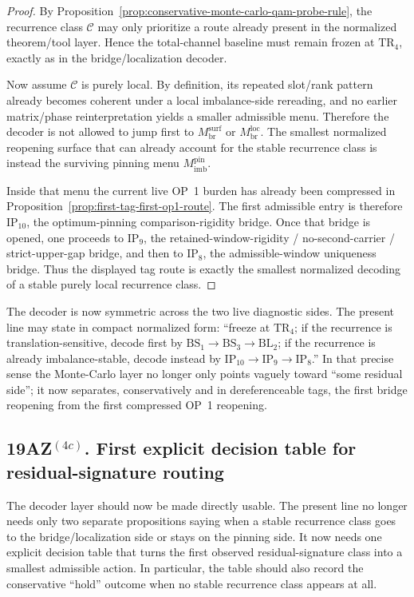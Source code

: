 \begin{proof}
By Proposition~\ref{prop:conservative-monte-carlo-qam-probe-rule}, the recurrence class \(\mathcal C\) may only prioritize a route already present in the normalized theorem/tool layer. Hence the total-channel baseline must remain frozen at \(\mathrm{TR}_4\), exactly as in the bridge/localization decoder.

Now assume \(\mathcal C\) is purely local. By definition, its repeated slot/rank pattern already becomes coherent under a local imbalance-side rereading, and no earlier matrix/phase reinterpretation yields a smaller admissible menu. Therefore the decoder is not allowed to jump first to \(M^{\mathrm{surf}}_{\mathrm{br}}\) or \(M^{\mathrm{loc}}_{\mathrm{br}}\). The smallest normalized reopening surface that can already account for the stable recurrence class is instead the surviving pinning menu \(M^{\mathrm{pin}}_{\mathrm{imb}}\).

Inside that menu the current live OP~1 burden has already been compressed in Proposition~\ref{prop:first-tag-first-op1-route}. The first admissible entry is therefore \(\mathrm{IP}_{10}\), the optimum-pinning comparison-rigidity bridge. Once that bridge is opened, one proceeds to \(\mathrm{IP}_9\), the retained-window-rigidity / no-second-carrier / strict-upper-gap bridge, and then to \(\mathrm{IP}_8\), the admissible-window uniqueness bridge. Thus the displayed tag route is exactly the smallest normalized decoding of a stable purely local recurrence class.
\end{proof}

\begin{remark}
\label{rem:what-the-first-monte-carlo-to-ip-decoding-buys}
The decoder is now symmetric across the two live diagnostic sides. The present line may state in compact normalized form: ``freeze at \(\mathrm{TR}_4\); if the recurrence is translation-sensitive, decode first by \(\mathrm{BS}_1\to\mathrm{BS}_3\to\mathrm{BL}_2\); if the recurrence is already imbalance-stable, decode instead by \(\mathrm{IP}_{10}\to\mathrm{IP}_9\to\mathrm{IP}_8\).'' In that precise sense the Monte-Carlo layer no longer only points vaguely toward ``some residual side''; it now separates, conservatively and in dereferenceable tags, the first bridge reopening from the first compressed OP~1 reopening.
\end{remark}


\subsection*{19AZ$^{(4c)}$. First explicit decision table for residual-signature routing}
\label{sec:first-explicit-decision-table-residual-signature-routing}
The decoder layer should now be made directly usable. The present line no longer needs only two separate propositions saying when a stable recurrence class goes to the bridge/localization side or stays on the pinning side. It now needs one explicit decision table that turns the first observed residual-signature class into a smallest admissible action. In particular, the table should also record the conservative ``hold'' outcome when no stable recurrence class appears at all.

